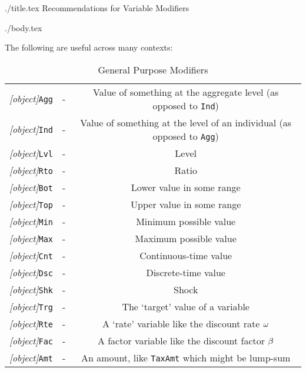 \documentclass[12pt]{econtex}
\begin{document}
\begin{verbatimwrite}{./title.tex}
Recommendations for Variable Modifiers
\end{verbatimwrite}

\title{}

\date{\today}
\maketitle 

\begin{verbatimwrite}{./body.tex}

The following are useful across many contexts:
\begin{table}[h]
	\centering
	\begin{tabular}{||>{\ttfamily}ccc||} 		
		\hline
   \textit{[object]}\texttt{Agg} & - & Value of something at the aggregate level (as opposed to \texttt{Ind})
\\ \textit{[object]}\texttt{Ind} & - & Value of something at the level of an individual (as opposed to \texttt{Agg})
\\ \textit{[object]}\texttt{Lvl} & - & Level 
\\ \textit{[object]}\texttt{Rto} & - & Ratio 
\\ \textit{[object]}\texttt{Bot} & - & Lower value in some range 
\\ \textit{[object]}\texttt{Top} & - & Upper value in some range 
\\ \textit{[object]}\texttt{Min} & - & Minimum possible value 
\\ \textit{[object]}\texttt{Max} & - & Maximum possible value 
\\ \textit{[object]}\texttt{Cnt} & - & Continuous-time value
\\ \textit{[object]}\texttt{Dsc} & - & Discrete-time value
\\ \textit{[object]}\texttt{Shk} & - & Shock 
\\ \textit{[object]}\texttt{Trg} & - & The `target' value of a variable 
\\ \textit{[object]}\texttt{Rte} & - & A `rate' variable like the discount rate $\omega$
\\ \textit{[object]}\texttt{Fac} & - & A factor variable like the discount factor $\beta$
\\ \textit{[object]}\texttt{Amt} & - & An amount, like \texttt{TaxAmt} which might be lump-sum
\\ 	\hline
	\end{tabular}
	\caption{General Purpose Modifiers}
	\label{table:General}
\end{table}	


\end{verbatimwrite}
\end{document}
